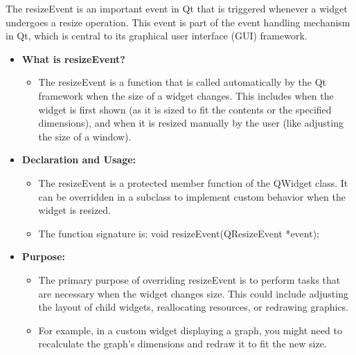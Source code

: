 \documentclass{report}
\begin{document}
    \pagebreak 
    \bigbreak \noindent 
    \begin{concept}
        The resizeEvent is an important event in Qt that is triggered whenever a widget undergoes a resize operation. This event is part of the event handling mechanism in Qt, which is central to its graphical user interface (GUI) framework.
    \end{concept}
    \begin{itemize}
        \item \textbf{What is resizeEvent?}
            \begin{itemize}
                \item The resizeEvent is a function that is called automatically by the Qt framework when the size of a widget changes. This includes when the widget is first shown (as it is sized to fit the contents or the specified dimensions), and when it is resized manually by the user (like adjusting the size of a window).
            \end{itemize}
        \item \textbf{Declaration and Usage:}
            \begin{itemize}
                \item The resizeEvent is a protected member function of the QWidget class. It can be overridden in a subclass to implement custom behavior when the widget is resized.
                \item The function signature is: void resizeEvent(QResizeEvent *event);
            \end{itemize}
        \item \textbf{Purpose:}
            \begin{itemize}
                \item The primary purpose of overriding resizeEvent is to perform tasks that are necessary when the widget changes size. This could include adjusting the layout of child widgets, reallocating resources, or redrawing graphics.
                \item For example, in a custom widget displaying a graph, you might need to recalculate the graph's dimensions and redraw it to fit the new size.
            \end{itemize}
    \end{itemize}
    \bigbreak \noindent 
\end{document}
